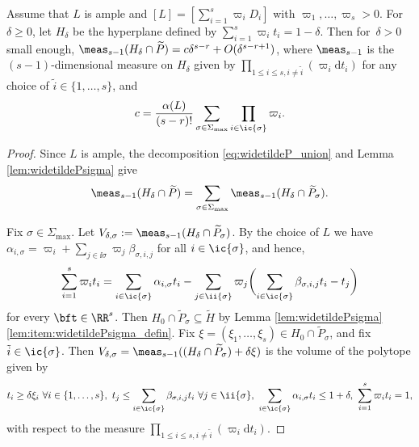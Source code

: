 \begin{lemma}
\label{lem:alpha_constant}
Assume that $L$ is ample and $[L]\!=\![\sum_{i=1}^s\varpi_i D_i]$ with \hbox{$\varpi_1,\dots,\varpi_s\!>\!0$}.
For $\delta\geq0$, let $H_\delta$ be the hyperplane defined by $\sum_{i=1}^s\varpi_i t_i\!=\!1\!-\!\delta$.
Then for~\hbox{$\delta\!>\!0$} small enough,
$\meas_{s-1}(H_\delta\cap\widetilde P)= c \delta^{s-r} +O(\delta^{s-r+1})$, where
$\meas_{s-1}$ is the \hbox{$(s-1)$}\nobreakdash-dimen\-sional measure on $H_\delta$ given by
$\prod_{1\leq i\leq s, i\neq\tilde i}(\varpi_i\mathrm dt_i)$
for any choice of $\tilde i\in\{1,\dots,s\}$, and
\[
c=\frac{\alpha(L)}{(s-r)!}\sum_{\sigma\in\Sigma_{\max}}\prod_{i\in\ic{\sigma}}\varpi_i.
\]
\end{lemma}
\begin{proof}
Since $L$ is ample, the decomposition \eqref{eq:widetildeP_union}
and Lemma \ref{lem:widetildePsigma} give
\[
\meas_{s-1}(H_\delta\cap\widetilde P)
= \sum_{\sigma\in\Sigma_{\max}}\meas_{s-1}(H_\delta\cap\widetilde P_\sigma).
\]

Fix $\sigma \in\Sigma_{\max}$.
Let $V_{\delta, \sigma}:=\meas_{s-1}(H_\delta\cap\widetilde P_\sigma)$.
By the choice of $L$ we have
$\alpha_{i,\sigma}=\varpi_i+\sum_{j\in\ii{\sigma}}\varpi_j\beta_{\sigma,i,j}$ for all $i\in\ic{\sigma}$,
and hence,
\[
\sum_{i=1}^s\varpi_i t_i
=\sum_{i\in\ic{\sigma}}\alpha_{i,\sigma} t_i
-\sum_{j\in\ii{\sigma}}\varpi_j\biggl(\sum_{i\in\ic{\sigma}}\beta_{\sigma,i,j}t_i-t_j\biggr)
\]
for every $\bft \in\RR^s$.
Then $H_0\cap \widetilde P_\sigma\subseteq \widetilde H$
by Lemma \ref{lem:widetildePsigma}\eqref{lem:item:widetildePsigma_defin}.
Fix $\xi=(\xi_1,\dots,\xi_s)\in H_0\cap \widetilde P_\sigma$, and fix $\tilde i\in\ic{\sigma}$.
Then $V_{\delta,\sigma}=\meas_{s-1}((H_\delta\cap \widetilde P_\sigma)+\delta\xi)$
is the volume of the polytope given by
\[
t_i\geq \delta\xi_i \ \forall i\in\{1,\dots,s\}, \
t_{j}
\leq \sum_{i\in\ic{\sigma}} \beta_{\sigma, i,j}t_i
\ \forall j\in\ii{\sigma}, \
\sum_{i\in\ic{\sigma}} \alpha_{i,\sigma}t_i \leq 1+\delta, \ \sum_{i=1}^s\varpi_i t_i=1,
\]
with respect to the measure $\prod_{1\leq i\leq s, i\neq\tilde i}(\varpi_i\mathrm dt_i)$.


\end{proof}
